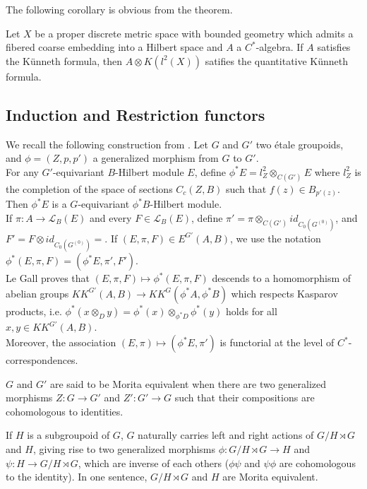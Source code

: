 The following corollary is obvious from the theorem.\cite{FinnSellFibred}

\begin{cor}
Let $X$ be a proper discrete metric space with bounded geometry which admits a fibered coarse embedding into a Hilbert space and $A$ a $C^*$-algebra. If $A$ satisfies the Künneth formula, then $A\otimes K(l^2(X))$ satifies the quantitative Künneth formula.
\end{cor}

\subsection{Induction and Restriction functors}

We recall the following construction from \cite{LeGall}. Let $G$ and $G'$ two étale groupoids, and $\phi=(Z,p,p')$ a generalized morphism from $G$ to $G'$. \\

For any $G'$-equivariant $B$-Hilbert module $E$, define $\phi^*E=l^2_Z\otimes_{C(G')} E$ where $l^2_Z $ is the completion of the space of sections $C_c(Z,B)$ such that $f(z)\in B_{p'(z)}$. Then $\phi^*E$ is a $G$-equivariant $\phi^*B$-Hilbert module. \\

If $\pi : A\rightarrow \mathcal L_B(E)$ and every $F\in\mathcal L_B(E)$, define $\pi' = \pi\otimes_{C(G')} id_{C_0(G^{(0)})}$, and $F'=F\otimes id_{C_0(G^{(0)})}= $. If $(E,\pi,F)\in E^{G'}(A,B)$, we use the notation $\phi^* (E,\pi,F)=(\phi^*E,\pi',F')$.\\

Le Gall proves \cite{LeGall} that $(E,\pi,F)\mapsto \phi^*(E,\pi,F)$ descends to a homomorphism of abelian groups $KK^{G'}(A,B)\rightarrow KK^{G}(\phi^*A,\phi^*B)$ which respects Kasparov products, i.e. $\phi^*(x\otimes_D y)= \phi^*(x)\otimes_{\phi^*D}\phi^*(y)$ holds for all $x,y\in KK^{G'}(A,B)$.\\

Moreover, the association $(E,\pi)\mapsto (\phi^*E, \pi')$ is functorial at the level of $C^*$-correspondences.

\begin{definition}
$G$ and $G'$ are said to be Morita equivalent when there are two generalized morphisms $Z : G\rightarrow G'$ and $Z' : G'\rightarrow G$ such that their compositions are cohomologous to identities.  
\end{definition}

If $H$ is a subgroupoid of $G$, $G$ naturally carries left and right actions of $G/H\rtimes G$ and $H$, giving rise to two generalized morphisms $\phi : G/H\rtimes G\rightarrow H$ and $\psi : H \rightarrow G/H\rtimes G$, which are inverse of each others ($\phi \psi$ and $\psi\phi$ are cohomologous to the identity). In one sentence, $G/H\rtimes G$ and $H$ are Morita equivalent.\\


